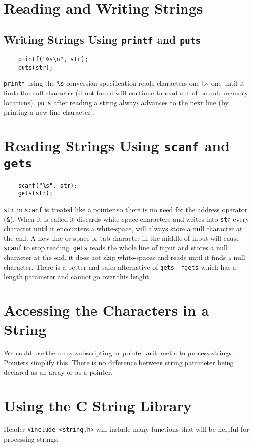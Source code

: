 \documentclass[openany]{book}
\begin{document}
    \section{Reading and Writing Strings}
    \subsection*{Writing Strings Using \texttt{printf} and \texttt{puts}}
    \begin{lstlisting}
    printf("%s\n", str);
    puts(str);
    \end{lstlisting}
    \texttt{printf} using the \texttt{\%s} conversion specification reads characters one by one until
    it finds the null character (if not found will continue to read out of bounds memory locations).
    \texttt{puts} after reading a string always advances to the next line (by printing a new-line
    character).

    \section{Reading Strings Using \texttt{scanf} and \texttt{gets}}
    \begin{lstlisting}
    scanf("%s", str);
    gets(str);
    \end{lstlisting}
    \texttt{str} in \texttt{scanf} is treated like a pointer so there is no need for the address
    operator (\texttt{\&}). When it is called it discards white-space characters and writes into
    \texttt{str} every character until it encounters a white-space, will always store a null
    character at the end. A new-line or space or tab character in the middle of input will cause 
    \texttt{scanf} to stop reading. \texttt{gets} reads the whole line of input and stores a
    null character at the end, it does not skip white-spaces and reads until it finds a null
    character. There is a better and safer alternative of \texttt{gets} - \texttt{fgets} which
    has a length parameter and cannot go over this lenght.

    \section{Accessing the Characters in a String}
    We could use the array subscripting or pointer arithmetic to process strings. Pointers simplify this. There is no difference
    between string parameter being declared as an array or as a pointer.

    \section{Using the C String Library}
    Header \texttt{\#include <string.h>} will include many functions that will be helpful for processing strings.
\end{document}
